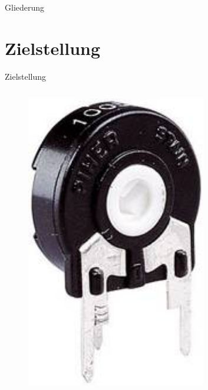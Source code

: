 \documentclass[hyphens]{beamer}
\begin{document}
 \begin{frame}
 \titlepage
 \end{frame}
 
 \begin{frame}{Gliederung}
 \tableofcontents
 \end{frame}
 
 \section{Zielstellung}
 \begin{frame}{Zielstellung}
 \begin{columns}[T]

\begin{column}{0.34\textwidth}
\begin{figure}
\includegraphics[width=0.7\textwidth]{pics/potentiometer-trimmer.jpg}
\end{figure}
\end{column}
\pause


\end{columns}
\end{frame}
\end{document}
